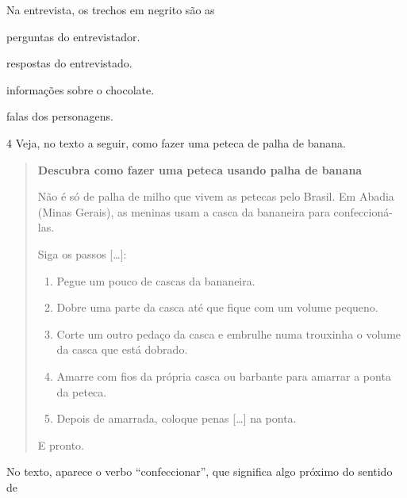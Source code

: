\pagebreak
Na entrevista, os trechos em negrito são as

\begin{escolha}
\item perguntas do entrevistador.

\item respostas do entrevistado.

\item informações sobre o chocolate.

\item falas dos personagens.
\end{escolha}



\num{4} Veja, no texto a seguir, como fazer uma peteca de palha de banana.

\begin{quote}
\textbf{Descubra como fazer uma peteca usando palha de banana}

Não é só de palha de milho que vivem as petecas pelo Brasil. Em Abadia
(Minas Gerais), as meninas usam a casca da bananeira para
confeccioná-las.

Siga os passos {[}\ldots{}{]}:

\begin{enumerate}
\item Pegue um pouco de cascas da bananeira.

\item Dobre uma parte da casca até que fique com um volume pequeno.

\item Corte um outro pedaço da casca e embrulhe numa trouxinha o volume da
casca que está dobrado.

\item Amarre com fios da própria casca ou barbante para amarrar a ponta da
peteca.

\item Depois de amarrada, coloque penas {[}\ldots{}{]} na ponta.
\end{enumerate}

E pronto.

\end{quote}

No texto, aparece o verbo ``confeccionar'', que significa algo próximo do sentido de

